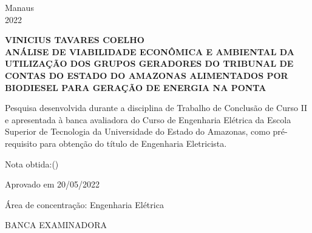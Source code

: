 \documentclass[12pt, a4paper]{article}
\newcommand{\bigsize}{\fontsize{12pt}{20pt}\selectfont}
\newcommand{\thesisTitle}{ANÁLISE DE VIABILIDADE ECONÔMICA E AMBIENTAL DA UTILIZAÇÃO DOS GRUPOS GERADORES DO TRIBUNAL DE CONTAS DO ESTADO DO AMAZONAS ALIMENTADOS POR BIODIESEL PARA GERAÇÃO DE ENERGIA NA PONTA}
\newcommand{\thesisAuthor}{VINICIUS TAVARES COELHO}
\begin{document}
\vspace*{\fill}
\begin{center}
Manaus \\ 2022
\end{center}





\newpage
\thispagestyle{empty}



\newpage
\thispagestyle{empty}
\begin{center}


\textbf{ {\bigsize \thesisAuthor} \\[50pt] }
\textbf{ {\bigsize \thesisTitle}  \\[50pt] }
\end{center}
\hspace*{8cm}
\begin{flushright}
\begin{minipage}{8cm}
\begin{singlespace}
Pesquisa desenvolvida durante a disciplina de Trabalho de Conclusão de Curso II e apresentada à banca avaliadora do Curso de Engenharia Elétrica da Escola Superior de Tecnologia da Universidade do Estado do Amazonas, como pré-requisito para obtenção do título de Engenharia Eletricista.\\[30pt]
\end{singlespace}
\end{minipage}
\end{flushright}
\begin{center}
Nota obtida:\uline{\hspace{1cm}}(\uline{\hspace{8cm}})
\vspace{1.0cm}
\begin{center}
Aprovado em 20/05/2022
\end{center}
Área de concentração: Engenharia Elétrica
\end{center}
\vspace{1.2cm}
\begin{center}
BANCA EXAMINADORA
\end{center}
\vspace{1.0cm}
\end{document}
